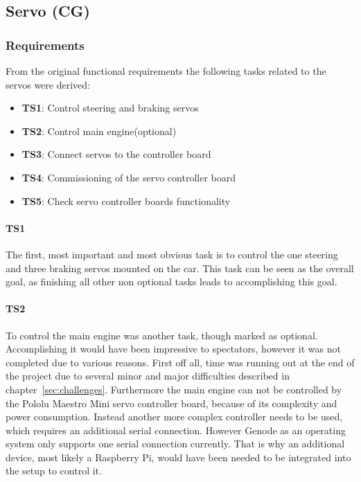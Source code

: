 \subsection{Servo (CG)}
\label{sec:servo}

\subsubsection{Requirements}
\label{sec:servo-require}
From the original functional requirements the following tasks related to the servos were derived:

\begin{itemize}
    \item \textbf{TS1}: Control steering and braking servos
    \item \textbf{TS2}: Control main engine(optional)
    \item \textbf{TS3}: Connect servos to the controller board
    \item \textbf{TS4}: Commissioning of the servo controller board
    \item \textbf{TS5}: Check servo controller boards functionality
\end{itemize}

\paragraph{\textbf{TS1}}
The first, most important and most obvious task is to control the one steering and three braking servos mounted on the car. This task can be seen as the overall goal, as finishing all other non optional tasks leads to accomplishing this goal.

\paragraph{\textbf{TS2}}
To control the main engine was another task, though marked as optional. Accomplishing it would have been impressive to spectators, however it was not completed due to various reasons. First off all, time was running out at the end of the project due to several minor and major difficulties described in chapter~\ref{sec:challenges}. Furthermore the main engine can not be controlled by the Pololu Maestro Mini servo controller board, because of its complexity and power consumption. Instead another more complex controller needs to be used, which requires an additional serial connection. However Genode as an operating system only supports one serial connection currently. That is why an additional device, most likely a Raspberry Pi, would have been needed to be integrated into the setup to control it.


